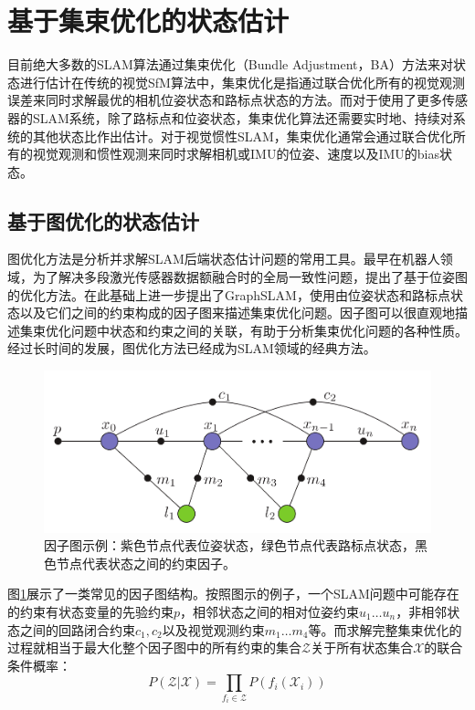\section{基于集束优化的状态估计}

目前绝大多数的SLAM算法通过集束优化\citep{triggs1999bundle}（Bundle Adjustment，BA）方法来对状态进行估计在传统的视觉SfM算法中，集束优化是指通过联合优化所有的视觉观测误差来同时求解最优的相机位姿状态和路标点状态的方法。而对于使用了更多传感器的SLAM系统，除了路标点和位姿状态，集束优化算法还需要实时地、持续对系统的其他状态比作出估计。对于视觉惯性SLAM，集束优化通常会通过联合优化所有的视觉观测和惯性观测来同时求解相机或IMU的位姿、速度以及IMU的bias状态。

\subsection{基于图优化的状态估计}

图优化方法是分析并求解SLAM后端状态估计问题的常用工具。最早在机器人领域，为了解决多段激光传感器数据额融合时的全局一致性问题，\citep{lu1997globally,lu1997robot}提出了基于位姿图的优化方法。\citeauthor{thrun2006graph}在此基础上进一步提出了GraphSLAM\citep{thrun2006graph}，使用由位姿状态和路标点状态以及它们之间的约束构成的因子图来描述集束优化问题。因子图可以很直观地描述集束优化问题中状态和约束之间的关联，有助于分析集束优化问题的各种性质。经过长时间的发展，图优化方法已经成为SLAM领域的经典方法。

\begin{figure}[htbp]
    \centering
    \includegraphics[width=.6\textwidth]{figs/factor_graph.png}
    \caption{因子图示例\citep{kaess2012isam2}：紫色节点代表位姿状态，绿色节点代表路标点状态，黑色节点代表状态之间的约束因子。}
    \label{fig:factor_graph}
\end{figure}

图\ref{fig:factor_graph}展示了一类常见的因子图结构。按照图示的例子，一个SLAM问题中可能存在的约束有状态变量的先验约束$p$，相邻状态之间的相对位姿约束$u_1 \dots u_n$，非相邻状态之间的回路闭合约束$c_1,c_2$以及视觉观测约束$m_1 \dots m_4$等。而求解完整集束优化的过程就相当于最大化整个因子图中的所有约束的集合$\mathcal{Z}$关于所有状态集合$\mathcal{X}$的联合条件概率：
\begin{equation}
    P(\mathcal{Z}|\mathcal{X}) = \prod_{f_i\in\mathcal{Z}} P(f_i(\mathcal{X}_i))
\end{equation}

